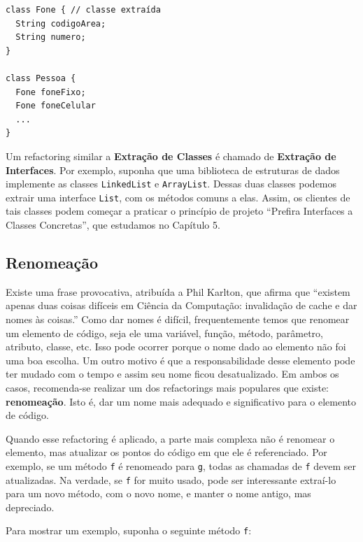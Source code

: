 \documentclass[
  11pt,
  twoside]{book}
\newcommand{\passthrough}[1]{#1}
\begin{document}
\begin{lstlisting}
class Fone { // classe extraída
  String codigoArea;
  String numero; 
}

class Pessoa {
  Fone foneFixo;
  Fone foneCelular
  ...
}
\end{lstlisting}

Um refactoring similar a \textbf{Extração de Classes} é chamado de
\textbf{Extração de Interfaces}. Por exemplo, suponha que uma biblioteca
de estruturas de dados implemente as classes
\passthrough{\lstinline!LinkedList!} e
\passthrough{\lstinline!ArrayList!}. Dessas duas classes podemos extrair
uma interface \passthrough{\lstinline!List!}, com os métodos comuns a
elas. Assim, os clientes de tais classes podem começar a praticar o
princípio de projeto ``Prefira Interfaces a Classes Concretas'', que
estudamos no Capítulo 5.

\hypertarget{renomeauxe7uxe3o}{%
\subsection{Renomeação}\label{renomeauxe7uxe3o}}


Existe uma frase provocativa, atribuída a Phil Karlton, que afirma que
``existem apenas duas coisas difíceis em Ciência da Computação:
invalidação de cache e dar nomes às coisas.'' Como dar nomes é difícil,
frequentemente temos que renomear um elemento de código, seja ele uma
variável, função, método, parâmetro, atributo, classe, etc. Isso pode
ocorrer porque o nome dado ao elemento não foi uma boa escolha. Um outro
motivo é que a responsabilidade desse elemento pode ter mudado com o
tempo e assim seu nome ficou desatualizado. Em ambos os casos,
recomenda-se realizar um dos refactorings mais populares que existe:
\textbf{renomeação}. Isto é, dar um nome mais adequado e significativo
para o elemento de código.

Quando esse refactoring é aplicado, a parte mais complexa não é renomear
o elemento, mas atualizar os pontos do código em que ele é referenciado.
Por exemplo, se um método \passthrough{\lstinline!f!} é renomeado para
\passthrough{\lstinline!g!}, todas as chamadas de
\passthrough{\lstinline!f!} devem ser atualizadas. Na verdade, se
\passthrough{\lstinline!f!} for muito usado, pode ser interessante
extraí-lo para um novo método, com o novo nome, e manter o nome antigo,
mas depreciado.

Para mostrar um exemplo, suponha o seguinte método
\passthrough{\lstinline!f!}:
\end{document}
